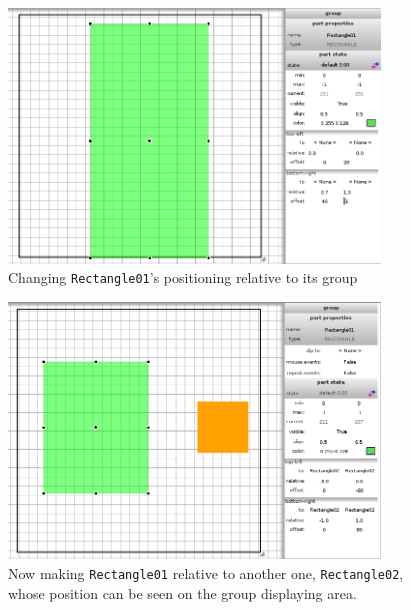 \documentclass[a4paper]{profusion}
\begin{document}
\begin{figure}[h!]
  \centering
  \includegraphics[width=0.88\textwidth]{images/rel_and_offset_changes.png}
  \caption{Changing \texttt{Rectangle01}'s positioning relative to its
    group}
  \label{fig:rel_and_offset_changes}
\end{figure}

\begin{figure}[h!]
  \centering
  \includegraphics[width=0.88\textwidth]{images/relative_to_other_part.png}
  \caption{Now making \texttt{Rectangle01} relative to another one,
    \texttt{Rectangle02}, whose position can be seen on the group
    displaying area.}
  \label{fig:relative_to_other_part}
\end{figure}
\end{document}
